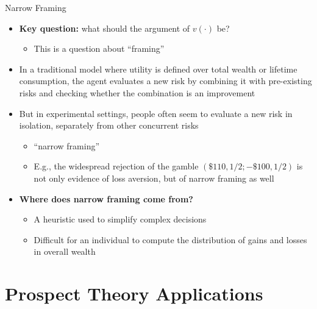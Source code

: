 \documentclass[aspectratio=169, 11pt]{beamer}
\begin{document}
\begin{frame}[shrink=5]{Narrow Framing}
\begin{itemize}
\item \textbf{Key question:} what should the argument of $v(\cdot)$ be?
  \begin{itemize}
  \item This is a question about ``framing''
  \end{itemize}
\item In a traditional model where utility is defined over total wealth or lifetime consumption, the agent evaluates a new risk by combining it with pre-existing risks and checking whether the combination is an improvement
\item But in experimental settings, people often seem to evaluate a new risk in isolation, separately from other concurrent risks
  \begin{itemize}
  \item ``narrow framing''
  \item E.g., the widespread rejection of the gamble $(\$110, 1/2; -\$100, 1/2)$ is not only evidence of loss aversion, but of narrow framing as well
  \end{itemize}
\item \textbf{Where does narrow framing come from?}
  \begin{itemize}
  \item A heuristic used to simplify complex decisions
  \item Difficult for an individual to compute the distribution of gains and losses in overall wealth
  \end{itemize}
\end{itemize}
\end{frame}

\section{Prospect Theory Applications}
\end{document}
